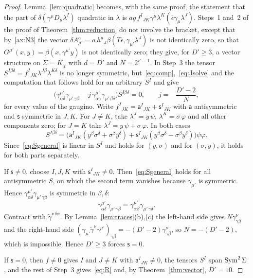 \begin{proof}
Lemma~\ref{lem:quadratic} becomes, with the same proof, the statement that the part of $\delta(\gamma^\mu D_\mu\lambda^I)$ quadratic in $\lambda$ is $ag\,f^I{}_{JK}\gamma^\mu\lambda^K(\bar\epsilon\gamma_\mu\lambda^J)$. Steps~1 and~2 of the proof of Theorem~\ref{thm:reduction} do not involve the bracket, except that by~\ref{ax:N3} the vector $\delta A^a_{\mu'}=a\,h^a{}_J\beta(T\epsilon,\gamma_{\mu'}\lambda^J)$ is not identically zero, so that $G^{\mu'}(x,y)=\beta(x,\gamma^{\mu'}y)$ is not identically zero; they give, for $D'\ge3$, a vector structure on $\Sigma=K_\chi$ with $d=D'$ and $N=2^{r'-1}$. In Step~3 the tensor $S^{I\beta\delta}=f^I{}_{JK}\lambda^{J\beta}\lambda^{K\delta}$ is no longer symmetric, but~\eqref{eq:comp},~\eqref{eq:Jsolve} and the computation that follows hold for an arbitrary $S^I$ and give
\begin{equation}
\label{eq:Sgeneral}
\bigl(\gamma^{\mu'}_{\alpha\delta}\gamma_{\mu'\,\gamma\beta}-j\,\gamma^{\mu'}_{\alpha\gamma}\gamma_{\mu'\,\beta\delta}\bigr)S^{I\beta\delta}=0,\qquad j=-\frac{D'-2}{N},
\end{equation}
for every value of the gaugino. Write $f^I{}_{JK}=\mathsf a^I{}_{JK}+\mathsf s^I{}_{JK}$ with $\mathsf a$ antisymmetric and $\mathsf s$ symmetric in $J,K$. For $J\ne K$, take $\lambda^J=y\,\psi$, $\lambda^K=\sigma\,\varphi$ and all other components zero; for $J=K$ take $\lambda^J=y\,\psi+\sigma\,\varphi$. In both cases
\[
S^{I\beta\delta}=\bigl(\mathsf a^I{}_{JK}(y^\beta\sigma^\delta+\sigma^\beta y^\delta)+\mathsf s^I{}_{JK}(y^\beta\sigma^\delta-\sigma^\beta y^\delta)\bigr)\psi\varphi .
\]
Since~\eqref{eq:Sgeneral} is linear in $S^I$ and holds for $(y,\sigma)$ and for $(\sigma,y)$, it holds for both parts separately.

If $\mathsf s\ne0$, choose $I,J,K$ with $\mathsf s^I{}_{JK}\ne0$. Then~\eqref{eq:Sgeneral} holds for all antisymmetric $S$, on which the second term vanishes because $\gamma_{\mu'}$ is symmetric. Hence $\gamma^{\mu'}_{\alpha\delta}\gamma_{\mu'\,\gamma\beta}$ is symmetric in $\beta,\delta$:
\[
\gamma^{\mu'}_{\alpha\delta}\gamma_{\mu'\,\gamma\beta}=\gamma^{\mu'}_{\alpha\beta}\gamma_{\mu'\,\gamma\delta}.
\]
Contract with $\tilde\gamma^{\nu\,\delta\alpha}$. By Lemma~\ref{lem:traces}(b),(c) the left-hand side gives $N\gamma^\nu_{\gamma\beta}$ and the right-hand side $(\gamma_{\mu'}\tilde\gamma^\nu\gamma^{\mu'})_{\gamma\beta}=-(D'-2)\gamma^\nu_{\gamma\beta}$, so $N=-(D'-2)$, which is impossible. Hence $D'\ge3$ forces $\mathsf s=0$.

If $\mathsf s=0$, then $f\ne0$ gives $I$ and $J\ne K$ with $\mathsf a^I{}_{JK}\ne0$, the tensors $S^I$ span $\operatorname{Sym}^2\Sigma$, and the rest of Step~3 gives~\eqref{eq:R} and, by Theorem~\ref{thm:vector}, $D'=10$.
\end{proof}

